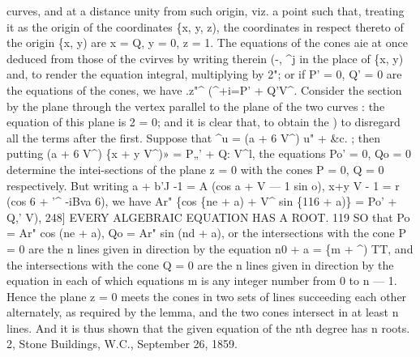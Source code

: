\documentclass[11pt,a4paper]{book}
\begin{document}
curves,  and  at  a  distance  unity  from  such  origin,  viz.  a  point  such  that,  treating  it
as  the  origin  of  the  coordinates  \{x,  y,  z),  the  coordinates  in  respect  thereto  of  the  origin
\{x,   y)   are  x  =  Q,  y  =  0,   z  =  1.     The   equations  of  the  cones  aie  at    once   deduced   from
those  of  the   cvirves  by   writing   therein  (-,   ^j  in   the   place   of  \{x,   y)   and,   to   render
the  equation  integral,  multiplying  by  2";  or  if  P'  =  0,  Q'  =  0  are  the  equations  of  the
cones,  we  have
.z"^
(^+^^)=P'  +  Q'V^.
Consider  the  section  by  the  plane  through  the  vertex  parallel  to   the  plane  of  the
two   curves :    the  equation   of  this  plane   is   2  =  0;    and   it   is   clear  that,   to   obtain   the
)
to  disregard  all  the  terms  after  the  first.     Suppose  that
^u  =  (a  +  6  V^)  u"  +  \&c. ;
then  putting
(a  +  6  V^)  \{x  +  y  V^)»  =  P„'  +  Q:  V^l,
the    equations   Po'  =  0,  Qo  =  0  determine   the   intei-sections   of    the   plane   z  =  0    with   the
cones  P  =  0,  Q  =  0  respectively.     But  writing
a  +  b'J  -1  =  A  (cos  a  +  V  —  1  sin  o),
x+y  V  -  1  =  r  (cos  6  +  '^  -iBva  6),
we   have
Ar"  \{cos  \{ne  +  a)  +  V^  sin  \{116  +  a)\}  =  Po'  +  Q,'  V^^i,
248]  EVERY    ALGEBRAIC   EQUATION   HAS    A   ROOT.  119
SO   that
Po  =  Ar"  cos  (ne  +  a),     Qo  =  Ar"  sin  (nd  +  a),
or  the  intersections  with  the  cone  P  =  0  are  the  n  lines  given  in  direction  by  the
equation
n0  +  a  =  \{m  +  ^)  TT,
and  the  intersections  with  the  cone  Q  =  0  are  the  n  lines  given  in  direction  by  the
equation
in  each  of  which  equations  m  is  any  integer  number  from  0  to  n  — 1.  Hence  the
plane  z  =  0  meets  the  cones  in  two  sets  of  lines  succeeding  each  other  alternately,  as
required  by  the  lemma,  and  the  two  cones  intersect  in  at  least  n  lines.  And  it  is
thus  shown  that  the  given  equation  of  the  nth  degree  has  n  roots.
2,  Stone  Buildings,  W.C.,  September  26,  1859.


\newpage
\end{document}
